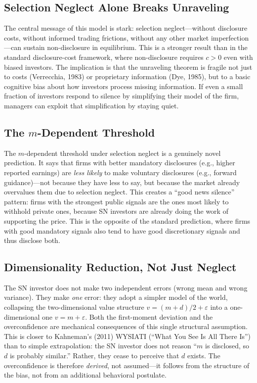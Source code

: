 \documentclass[12pt]{article}
\theoremstyle{plain}
\theoremstyle{definition}
\begin{document}
\subsection{Selection Neglect Alone Breaks Unraveling}

The central message of this model is stark: selection neglect---without disclosure costs, without informed trading frictions, without any other market imperfection---can sustain non-disclosure in equilibrium. This is a stronger result than in the standard disclosure-cost framework, where non-disclosure requires $c > 0$ even with biased investors. The implication is that the unraveling theorem is fragile not just to costs (Verrecchia, 1983) or proprietary information (Dye, 1985), but to a basic cognitive bias about how investors process missing information. If even a small fraction of investors respond to silence by simplifying their model of the firm, managers can exploit that simplification by staying quiet.

\subsection{The $m$-Dependent Threshold}

The $m$-dependent threshold under selection neglect is a genuinely novel prediction. It says that firms with better mandatory disclosures (e.g., higher reported earnings) are \emph{less likely} to make voluntary disclosures (e.g., forward guidance)---not because they have less to say, but because the market already overvalues them due to selection neglect. This creates a ``good news silence'' pattern: firms with the strongest public signals are the ones most likely to withhold private ones, because SN investors are already doing the work of supporting the price. This is the opposite of the standard prediction, where firms with good mandatory signals also tend to have good discretionary signals and thus disclose both.

\subsection{Dimensionality Reduction, Not Just Neglect}

The SN investor does not make two independent errors (wrong mean and wrong variance). They make \emph{one} error: they adopt a simpler model of the world, collapsing the two-dimensional value structure $v = (m+d)/2 + \varepsilon$ into a one-dimensional one $v = m + \varepsilon$. Both the first-moment deviation and the overconfidence are mechanical consequences of this single structural assumption. This is closer to Kahneman's (2011) WYSIATI (``What You See Is All There Is'') than to simple extrapolation: the SN investor does not reason ``$m$ is disclosed, so $d$ is probably similar.'' Rather, they cease to perceive that $d$ exists. The overconfidence is therefore \emph{derived}, not assumed---it follows from the structure of the bias, not from an additional behavioral postulate.
\end{document}
